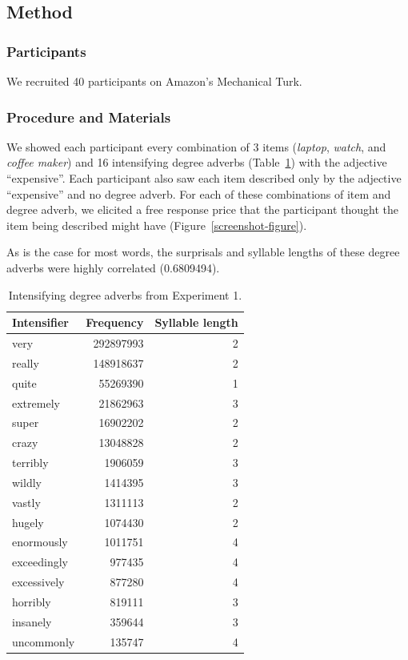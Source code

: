 \documentclass[10pt,letterpaper]{article}
\begin{document}
  \subsection{Method}
    \subsubsection{Participants}
      We recruited 40 participants on Amazon's Mechanical Turk.
    \subsubsection{Procedure and Materials}
      We showed each participant every combination of 3 items (\emph{laptop}, \emph{watch}, and \emph{coffee maker}) and 16 intensifying degree adverbs (Table~\ref{intensifiers-table}) with the adjective ``expensive''. Each participant also saw each item described only by the adjective ``expensive'' and no degree adverb. For each of these combinations of item and degree adverb, we elicited a free response price that the participant thought the item being described might have (Figure~\ref{screenshot-figure}).
      
       As is the case for most words, the surprisals and syllable lengths of these degree adverbs were highly correlated (0.6809494).
      
      \begin{table}[!ht]
      \begin{center} 
      \caption{Intensifying degree adverbs from Experiment 1.} 
      \label{intensifiers-table} 
      \vskip 0.12in
      \begin{tabular}{lrr} 
      \hline
      Intensifier    &  Frequency & Syllable length \\
      \hline
      very & 292897993 & 2 \\ 
      really & 148918637 & 2 \\ 
      quite & 55269390 & 1 \\ 
      extremely & 21862963 & 3 \\ 
      super & 16902202 & 2 \\ 
      crazy & 13048828 & 2 \\ 
      terribly & 1906059 & 3 \\ 
      wildly & 1414395 & 3 \\ 
      vastly & 1311113 & 2 \\ 
      hugely & 1074430 & 2 \\ 
      enormously & 1011751 & 4 \\ 
      exceedingly & 977435 & 4 \\ 
      excessively & 877280 & 4 \\ 
      horribly & 819111 & 3 \\ 
      insanely & 359644 & 3 \\ 
      uncommonly & 135747 & 4 \\
      \hline
      \end{tabular} 
      \end{center} 
      \end{table}
    
\end{document}
